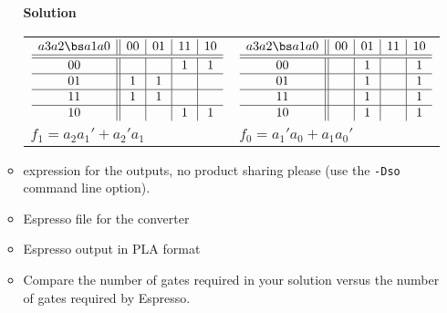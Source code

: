 \begin{enumerate}
\begin{itemize}
                \begin{onlysolution}  \textbf{Solution} \itshape{
                        \begin{tabular}{ll}
                            $
                            \begin{array} {c||c|c|c|c}
                                a3 a2 \bs a1 a0 & 00 & 01 & 11 & 10 \\ \hline \hline
                                00        &    &    & 1  & 1  \\ \hline
                                01        & 1  & 1  &    &    \\ \hline
                                11        & 1  & 1  &    &    \\ \hline
                                10        &    &    & 1  & 1  \\
                            \end{array}$ &
                            $
                            \begin{array} {c||c|c|c|c}
                                a3 a2 \bs a1 a0 & 00 & 01 & 11 & 10 \\ \hline \hline
                                00        &    & 1  &    & 1  \\ \hline
                                01        &    & 1  &    & 1  \\ \hline
                                11        &    & 1  &    & 1  \\ \hline
                                10        &    & 1  &    & 1  \\
                            \end{array}$ \\
                            $f_1 = a_2a_1'+a_2'a_1$ & $f_0 = a_1'a_0+a_1a_0'$ \\
                        \end{tabular}
                    }
                \end{onlysolution}

            \item \SOPmin expression for the outputs, no product sharing please
                (use the \verb+-Dso+ command line option).
            \item Espresso file for the converter
            \item Espresso output in PLA format
            \item Compare the number of gates required in your solution
                versus the number of gates required by Espresso.
        \end{itemize}


\end{enumerate}
